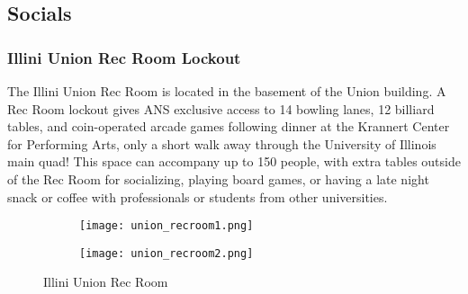 \subsection{Socials}

\subsubsection{Illini Union Rec Room Lockout}
The Illini Union Rec Room is located in the basement of the Union building. A Rec Room lockout gives ANS exclusive access to 14 bowling lanes, 12 billiard tables, and coin-operated arcade games following dinner at the Krannert Center for Performing Arts, only a short walk away through the University of Illinois main quad! This space can accompany up to 150 people, with extra tables outside of the Rec Room for socializing, playing board games, or having a late night snack or coffee with professionals or students from other universities.
\vspace{0.5cm}\newline
\begin{figure}[H]
	\centering
	\begin{subfigure}{0.5\textwidth}
		\centering
		\texttt{[image: union\_recroom1.png]}
	\end{subfigure}%
	\begin{subfigure}{0.5\textwidth}
		\centering
		\texttt{[image: union\_recroom2.png]}
	\end{subfigure}	
	\caption{Illini Union Rec Room}	
\end{figure} 

